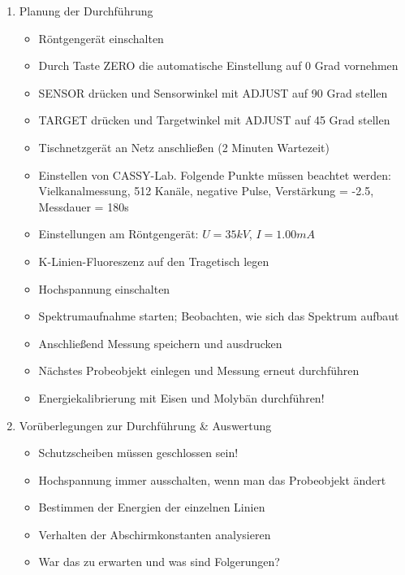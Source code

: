 \documentclass{article}
\begin{document}
\begin{enumerate}[label = (\Roman*)]
    \item Planung der Durchführung
        \begin{itemize}
            \item Röntgengerät einschalten
            \item Durch Taste ZERO die automatische Einstellung auf 0 Grad vornehmen
            \item SENSOR drücken und Sensorwinkel mit ADJUST auf 90 Grad stellen
            \item TARGET drücken und Targetwinkel mit ADJUST auf 45 Grad stellen
            \item Tischnetzgerät an Netz anschließen (2 Minuten Wartezeit)
            \item Einstellen von CASSY-Lab. Folgende Punkte müssen beachtet werden: Vielkanalmessung, 512 Kanäle, negative Pulse, Verstärkung = -2.5, Messdauer = 180s
            \item Einstellungen am Röntgengerät: $U=35kV$, $I=1.00mA$
            \item K-Linien-Fluoreszenz auf den Tragetisch legen
            \item Hochspannung einschalten
            \item Spektrumaufnahme starten; Beobachten, wie sich das Spektrum aufbaut
            \item Anschließend Messung speichern und ausdrucken
            \item Nächstes Probeobjekt einlegen und Messung erneut durchführen
            \item Energiekalibrierung mit Eisen und Molybän durchführen!
        \end{itemize}

    \item Vorüberlegungen zur Durchführung \& Auswertung
        \begin{itemize}
            \item Schutzscheiben müssen geschlossen sein!
            \item Hochspannung immer ausschalten, wenn man das Probeobjekt ändert
            \item Bestimmen der Energien der einzelnen Linien
            \item Verhalten der Abschirmkonstanten analysieren
            \item War das zu erwarten und was sind Folgerungen?
        \end{itemize}
    
\end{enumerate}
\end{document}
